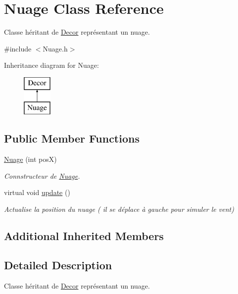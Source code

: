 \hypertarget{classNuage}{\section{Nuage Class Reference}
\label{classNuage}
}


Classe héritant de \hyperlink{classDecor}{Decor} représentant un nuage.  




{\ttfamily \#include $<$Nuage.\-h$>$}

Inheritance diagram for Nuage\-:\begin{figure}[H]
\begin{center}
\leavevmode
\includegraphics[height=2.000000cm]{classNuage}
\end{center}
\end{figure}
\subsection*{Public Member Functions}
\begin{DoxyCompactItemize}
\item 
\hyperlink{classNuage_a39282b99f479b3da4fc3cef6491ed97a}{Nuage} (int pos\-X)
\begin{DoxyCompactList}\small\item\em Connstructeur de \hyperlink{classNuage}{Nuage}. \end{DoxyCompactList}\item 
\hypertarget{classNuage_aa6a28e19b52f440d9d5214176e72ed15}{virtual void \hyperlink{classNuage_aa6a28e19b52f440d9d5214176e72ed15}{update} ()}\label{classNuage_aa6a28e19b52f440d9d5214176e72ed15}

\begin{DoxyCompactList}\small\item\em Actualise la position du nuage ( il se déplace à gauche pour simuler le vent) \end{DoxyCompactList}\end{DoxyCompactItemize}
\subsection*{Additional Inherited Members}


\subsection{Detailed Description}
Classe héritant de \hyperlink{classDecor}{Decor} représentant un nuage. 

